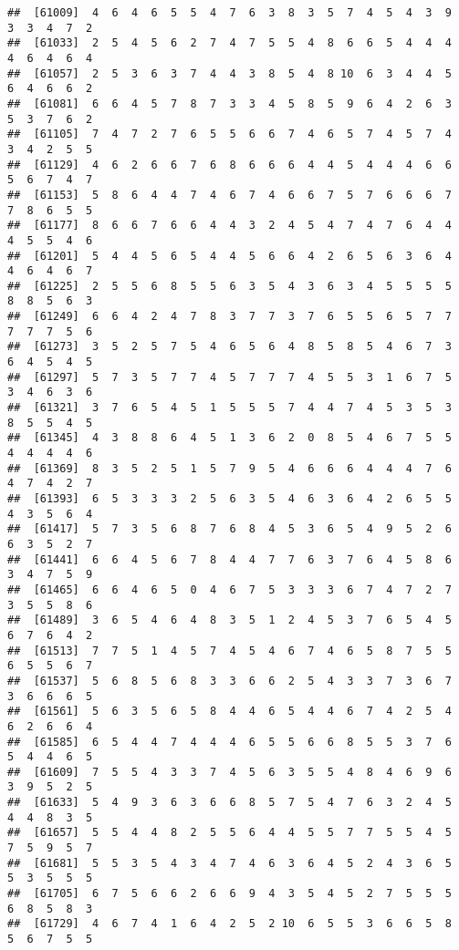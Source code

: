 \documentclass[
]{book}
\begin{document}
\begin{verbatim}
##  [61009]  4  6  4  6  5  5  4  7  6  3  8  3  5  7  4  5  4  3  9  3  3  4  7  2
##  [61033]  2  5  4  5  6  2  7  4  7  5  5  4  8  6  6  5  4  4  4  4  6  4  6  4
##  [61057]  2  5  3  6  3  7  4  4  3  8  5  4  8 10  6  3  4  4  5  6  4  6  6  2
##  [61081]  6  6  4  5  7  8  7  3  3  4  5  8  5  9  6  4  2  6  3  5  3  7  6  2
##  [61105]  7  4  7  2  7  6  5  5  6  6  7  4  6  5  7  4  5  7  4  3  4  2  5  5
##  [61129]  4  6  2  6  6  7  6  8  6  6  6  4  4  5  4  4  4  6  6  5  6  7  4  7
##  [61153]  5  8  6  4  4  7  4  6  7  4  6  6  7  5  7  6  6  6  7  7  8  6  5  5
##  [61177]  8  6  6  7  6  6  4  4  3  2  4  5  4  7  4  7  6  4  4  4  5  5  4  6
##  [61201]  5  4  4  5  6  5  4  4  5  6  6  4  2  6  5  6  3  6  4  4  6  4  6  7
##  [61225]  2  5  5  6  8  5  5  6  3  5  4  3  6  3  4  5  5  5  5  8  8  5  6  3
##  [61249]  6  6  4  2  4  7  8  3  7  7  3  7  6  5  5  6  5  7  7  7  7  7  5  6
##  [61273]  3  5  2  5  7  5  4  6  5  6  4  8  5  8  5  4  6  7  3  6  4  5  4  5
##  [61297]  5  7  3  5  7  7  4  5  7  7  7  4  5  5  3  1  6  7  5  3  4  6  3  6
##  [61321]  3  7  6  5  4  5  1  5  5  5  7  4  4  7  4  5  3  5  3  8  5  5  4  5
##  [61345]  4  3  8  8  6  4  5  1  3  6  2  0  8  5  4  6  7  5  5  4  4  4  4  6
##  [61369]  8  3  5  2  5  1  5  7  9  5  4  6  6  6  4  4  4  7  6  4  7  4  2  7
##  [61393]  6  5  3  3  3  2  5  6  3  5  4  6  3  6  4  2  6  5  5  4  3  5  6  4
##  [61417]  5  7  3  5  6  8  7  6  8  4  5  3  6  5  4  9  5  2  6  6  3  5  2  7
##  [61441]  6  6  4  5  6  7  8  4  4  7  7  6  3  7  6  4  5  8  6  3  4  7  5  9
##  [61465]  6  6  4  6  5  0  4  6  7  5  3  3  3  6  7  4  7  2  7  3  5  5  8  6
##  [61489]  3  6  5  4  6  4  8  3  5  1  2  4  5  3  7  6  5  4  5  6  7  6  4  2
##  [61513]  7  7  5  1  4  5  7  4  5  4  6  7  4  6  5  8  7  5  5  6  5  5  6  7
##  [61537]  5  6  8  5  6  8  3  3  6  6  2  5  4  3  3  7  3  6  7  3  6  6  6  5
##  [61561]  5  6  3  5  6  5  8  4  4  6  5  4  4  6  7  4  2  5  4  6  2  6  6  4
##  [61585]  6  5  4  4  7  4  4  4  6  5  5  6  6  8  5  5  3  7  6  5  4  4  6  5
##  [61609]  7  5  5  4  3  3  7  4  5  6  3  5  5  4  8  4  6  9  6  3  9  5  2  5
##  [61633]  5  4  9  3  6  3  6  6  8  5  7  5  4  7  6  3  2  4  5  4  4  8  3  5
##  [61657]  5  5  4  4  8  2  5  5  6  4  4  5  5  7  7  5  5  4  5  7  5  9  5  7
##  [61681]  5  5  3  5  4  3  4  7  4  6  3  6  4  5  2  4  3  6  5  5  3  5  5  5
##  [61705]  6  7  5  6  6  2  6  6  9  4  3  5  4  5  2  7  5  5  5  6  8  5  8  3
##  [61729]  4  6  7  4  1  6  4  2  5  2 10  6  5  5  3  6  6  5  8  5  6  7  5  5

\end{verbatim}
\end{document}
